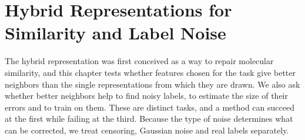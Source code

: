 \chapter{Hybrid Representations for Similarity and Label Noise}\label{chap:similarity}

The hybrid representation was first conceived as a way to repair molecular similarity, and this chapter tests whether features chosen for the task give better neighbors than the single representations from which they are drawn. We also ask whether better neighbors help to find noisy labels, to estimate the size of their errors and to train on them. These are distinct tasks, and a method can succeed at the first while failing at the third. Because the type of noise determines what can be corrected, we treat censoring, Gaussian noise and real labels separately.


